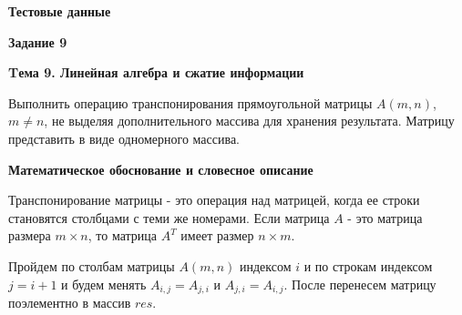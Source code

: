 \documentclass[12pt, a4paper]{article}
\begin{document}
		{\textbf{Тестовые данные}\par

		}


		\begin{flushleft}
			\newpage
			{\textbf{Задание 9}}\par
			{\textbf{Tема 9. Линейная алгебра и сжатие информации}}\par
			{Выполнить операцию транспонирования прямоугольной матрицы
			$A(m,n)$, $m\neq n$, не выделяя дополнительного массива для хранения
			результата. Матрицу представить в виде одномерного массива.}\par
			{\textbf{Математическое обоснование и словесное описание}\par
			Транспонирование матрицы - это операция над матрицей,
			когда ее строки становятся столбцами с теми же номерами.
			Если матрица $A$ - это матрица размера $m \times n$,
			то матрица $A^T$ имеет размер $n \times m$.\par
			Пройдем по столбам матрицы $A(m,n)$ индексом $i$ и по строкам индексом $j=i+1$
			и будем менять $A_{i,j}=A_{j,i}$ и $A_{j,i}=A_{i,j}$. После перенесем
			матрицу поэлементно в массив $res$.
			}\par

		\end{flushleft}
		\newpage
\end{document}
